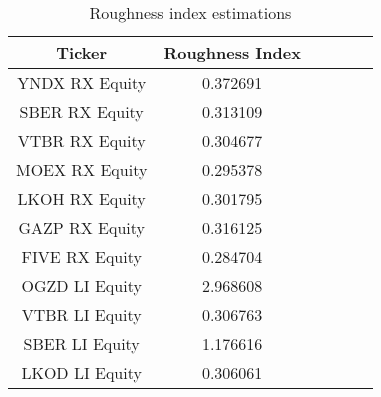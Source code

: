 \begin{table}[h]
	\begin{tabular}{|c|c|c|c|c|c|}
		\hline
		Ticker &  Roughness Index\\\hline
		\hline
		YNDX RX Equity & 0.372691\\\hline
		SBER RX Equity & 0.313109\\\hline
		VTBR RX Equity & 0.304677\\\hline
		MOEX RX Equity & 0.295378\\\hline
		LKOH RX Equity & 0.301795\\\hline
		GAZP RX Equity & 0.316125\\\hline
		FIVE RX Equity & 0.284704\\\hline
		OGZD LI Equity & 2.968608\\\hline
		VTBR LI Equity & 0.306763\\\hline
		SBER LI Equity & 1.176616\\\hline
		LKOD LI Equity & 0.306061\\\hline
	\end{tabular}
	\caption{Roughness index estimations}
	\label{tab:roughness_indexes}
\end{table}
